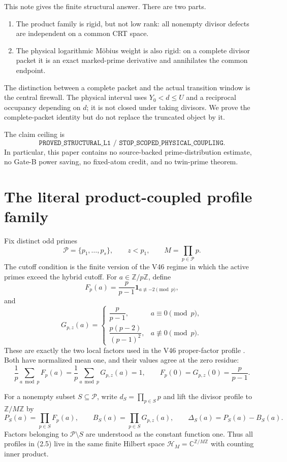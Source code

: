 \documentclass[11pt]{article}
\newcommand{\C}{\mathbb C}
\newcommand{\Z}{\mathbb Z}
\newcommand{\one}{\mathbf 1}
\newcommand{\DeltaP}{\Delta}
\begin{document}
This note gives the finite structural answer.  There are two parts.

\begin{enumerate}[leftmargin=2em]
  \item The product family is rigid, but not low rank: all nonempty divisor
        defects are independent on a common CRT space.
  \item The physical logarithmic M\"obius weight is also rigid: on a complete
        divisor packet it is an exact marked-prime derivative and annihilates
        the common endpoint.
\end{enumerate}

The distinction between a complete packet and the actual transition window is
the central firewall.  The physical interval uses
$Y_0<d\leq U$ and a reciprocal occupancy depending on $d$; it is not closed
under taking divisors.  We prove the complete-packet identity but do not
replace the truncated object by it.

The claim ceiling is
\[
\boxed{\texttt{PROVED\_STRUCTURAL\_L1 / STOP\_SCOPED\_PHYSICAL\_COUPLING}.}
\]
In particular, this paper contains no source-backed prime-distribution
estimate, no Gate-B power saving, no fixed-atom credit, and no twin-prime
theorem.

\section{The literal product-coupled profile family}

Fix distinct odd primes
\[
 \mathcal P=\{p_1,\ldots,p_s\},\qquad z< p_1,\qquad
 M=\prod_{p\in\mathcal P}p.
 \tag{2.1}
\]
The cutoff condition is the finite version of the V46 regime in which the
active primes exceed the hybrid cutoff.  For $a\in\Z/p\Z$, define
\[
 F_p(a)=\frac{p}{p-1}\one_{a\not\equiv-2\pmod p},
 \tag{2.2}
\]
and
\[
 G_{p,z}(a)=
 \begin{cases}
 \dfrac{p}{p-1},&a\equiv0\pmod p,\\[2mm]
 \dfrac{p(p-2)}{(p-1)^2},&a\not\equiv0\pmod p.
 \end{cases}
 \tag{2.3}
\]
These are exactly the two local factors used in the V46 proper-factor
profile \cite{WangV46}.  Both have normalized mean one, and their values agree
at the zero residue:
\[
 \frac1p\sum_{a\bmod p}F_p(a)=
 \frac1p\sum_{a\bmod p}G_{p,z}(a)=1,
 \qquad F_p(0)=G_{p,z}(0)=\frac{p}{p-1}.
 \tag{2.4}
\]

For a nonempty subset $S\subseteq\mathcal P$, write
$d_S=\prod_{p\in S}p$ and lift the divisor profile to $\Z/M\Z$ by
\[
 P_S(a)=\prod_{p\in S}F_p(a),\qquad
 B_S(a)=\prod_{p\in S}G_{p,z}(a),\qquad
 \DeltaP_S(a)=P_S(a)-B_S(a).
 \tag{2.5}
\]
Factors belonging to $\mathcal P\setminus S$ are understood as the constant
function one.  Thus all profiles in (2.5) live in the same finite Hilbert
space $\mathcal H_M=\C^{\Z/M\Z}$ with counting inner product.
\end{document}
